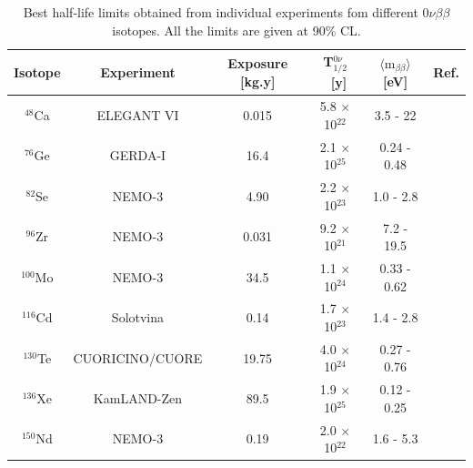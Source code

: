 \documentclass[main.tex]{subfiles}
\begin{document}
\begin{table}[h!]
\centering
\begin{tabular}{cccccc}
\toprule
Isotope & Experiment & Exposure [kg.y]& T$_{\text{1/2}}^{\text{0}\nu}$~[y] & $\langle \text{m}_{\beta\beta} \rangle$ [eV]&  Ref. \\
\midrule
$^{\text{48}}$Ca  & ELEGANT VI       & 0.015 & 5.8 $\times$ 10$^{\text{22}}$ & 3.5 - 22    & \cite{ELEGANTVI}       \\[0.1cm]
$^{\text{76}}$Ge  & GERDA-I          & 16.4  & 2.1 $\times$ 10$^{\text{25}}$ & 0.24 - 0.48 & \cite{GERDA}           \\[0.1cm]
$^{\text{82}}$Se  & NEMO-3           & 4.90  & 2.2 $\times$ 10$^{\text{23}}$ & 1.0 - 2.8   & \cite{ThesisJMott}     \\[0.1cm]
$^{\text{96}}$Zr  & NEMO-3           & 0.031 & 9.2 $\times$ 10$^{\text{21}}$ & 7.2 - 19.5  & \cite{NEMO3:Zr96}      \\[0.1cm]
$^{\text{100}}$Mo & NEMO-3           & 34.5  & 1.1 $\times$ 10$^{\text{24}}$ & 0.33 - 0.62 & \cite{NEMO3:Mo100}     \\[0.1cm]
$^{\text{116}}$Cd & Solotvina        & 0.14  & 1.7 $\times$ 10$^{\text{23}}$ & 1.4 - 2.8   & \cite{Solotvina}       \\[0.1cm]
$^{\text{130}}$Te & CUORICINO/CUORE  & 19.75 & 4.0 $\times$ 10$^{\text{24}}$ & 0.27 - 0.76 & \cite{CUORE-TeResults} \\[0.1cm]
$^{\text{136}}$Xe & KamLAND-Zen      & 89.5  & 1.9 $\times$ 10$^{\text{25}}$ & 0.12 - 0.25 & \cite{KamLAND-Zen}     \\[0.1cm]
$^{\text{150}}$Nd & NEMO-3           & 0.19  & 2.0 $\times$ 10$^{\text{22}}$ & 1.6 - 5.3   & \cite{NEMO3:Nd150}     \\
\bottomrule
\end{tabular}
\caption{Best half-life limits obtained from individual experiments fom different 0$\nu\beta\beta$ isotopes. All the limits are given at 90\% CL.}
\label{tab:summaryBB0NUmeasurements}
\end{table}
\end{document}
